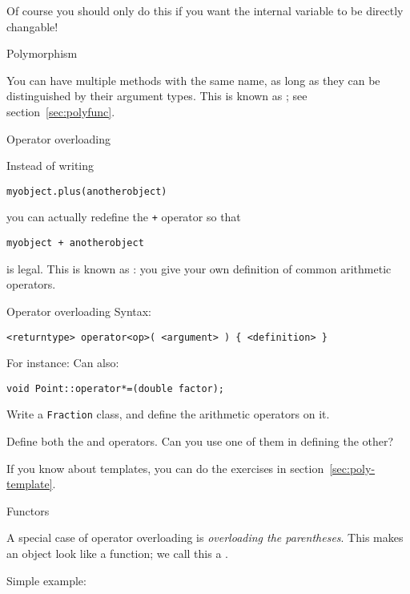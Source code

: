 Of course you should only do this if you want the internal variable to
be directly changable!

 {Polymorphism}

You can have multiple methods with the same name, as long as they can
be distinguished by their argument types. This is known as ;
see section~\ref{sec:polyfunc}.

 {Operator overloading}
\label{sec:operatordef}

Instead of writing 
\begin{lstlisting}
myobject.plus(anotherobject)
\end{lstlisting}
you can actually redefine the \lstinline{+} operator so that
\begin{lstlisting}
myobject + anotherobject
\end{lstlisting}
is legal. This is known as :
you give your own definition of common arithmetic operators.

\begin{block}{Operator overloading}
  \label{sl:object-operator}
  Syntax:
\begin{lstlisting}
<returntype> operator<op>( <argument> ) { <definition> }
\end{lstlisting}
For instance:
%
%
Can also:
\begin{lstlisting}
void Point::operator*=(double factor);
\end{lstlisting}
\end{block}

\begin{exercise}
  Write a \lstinline{Fraction} class, and define the arithmetic operators on it.

  Define both the \n{+} and \n{+=} operators. Can you use one of them
  in defining the other?
\end{exercise}
\begin{exercise}
  If you know about templates, you can do the exercises in section~\ref{sec:poly-template}.
\end{exercise}

 {Functors}

A special case of operator overloading is
%
\emph{overloading the parentheses}. This makes an object look like a
function; we call this a .

Simple example:
%

